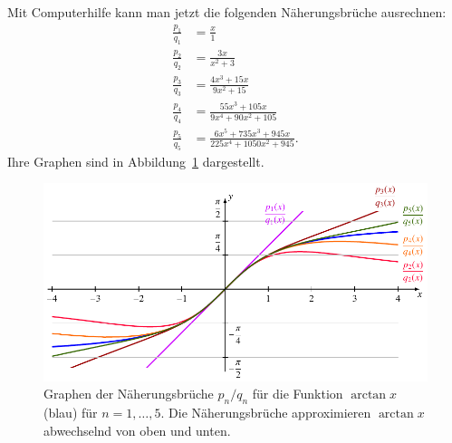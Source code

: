 \begin{refsection}
Mit Computerhilfe kann man jetzt die folgenden Näherungsbrüche ausrechnen:
\begin{align*}
\frac{p_1}{q_1} &= \frac{x}{1}
\\
\frac{p_2}{q_2} &= \frac{3x}{x^2+3}
\\
\frac{p_3}{q_3} &= \frac{4x^3+15x}{9x^2+15}
\\
\frac{p_4}{q_4} &= \frac{55x^3+105x}{9x^4+90x^2+105}
\\
\frac{p_5}{q_5} &= \frac{6x^5+735x^3+945x}{225x^4+1050x^2+945}.
\end{align*}
Ihre Graphen sind in Abbildung~\ref{arctan:figure:approx} dargestellt.
\begin{figure}
\centering
\includegraphics[width=\hsize]{papers/arctan/approx.pdf}
\caption{Graphen der Näherungsbrüche $p_n/q_n$ für die Funktion $\arctan x$
(blau)
für $n=1,\dots,5$.
Die Näherungsbrüche approximieren $\arctan x$ abwechselnd von oben und unten.
\label{arctan:figure:approx}}
\end{figure}


\end{refsection}
